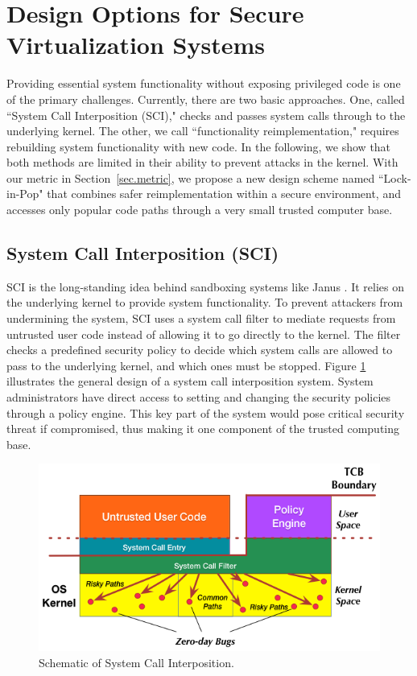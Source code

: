 \section{Design Options for Secure Virtualization Systems}
\label{sec.design}

Providing essential system functionality without exposing privileged code is one of the
primary challenges. 
Currently, there are two basic approaches.
One, called ``System Call Interposition (SCI)," checks and passes system calls
through to the underlying kernel. The other, we call ``functionality
reimplementation," 
requires rebuilding system functionality with new code. In the
following, we show that both methods are limited in their ability to
prevent attacks in the kernel. 
With our metric in Section~\ref{sec.metric}, 
we propose a new design scheme named ``Lock-in-Pop" that combines safer reimplementation
within a secure environment, and accesses only popular code paths through a
very small trusted computer base.


\subsection{System Call Interposition (SCI)}
SCI is the long-standing idea behind sandboxing systems like Janus
\cite{Janus0:96, Janus:99}. It relies on the underlying kernel
to provide system functionality. To prevent attackers from undermining the system,
SCI uses a system call filter to mediate requests
from untrusted user code instead of allowing it to go directly to the kernel.
The filter checks a predefined security policy to decide which system calls are
allowed to pass to the underlying kernel, and which ones must be stopped.
Figure \ref{fig:design_system_call_interposition} illustrates the general design
of a system call interposition system. System administrators have direct access to 
setting and changing the security policies through a policy engine. 
This key part of the system would pose critical security threat if compromised, thus making it 
one component of the trusted computing base. 

\begin{figure}%
\centering
\includegraphics[width=1.0\columnwidth]{diagram/Virtualization_Design_Model_03.png}
\caption{\small Schematic of System Call Interposition.}
\label{fig:design_system_call_interposition}
\end{figure}  

